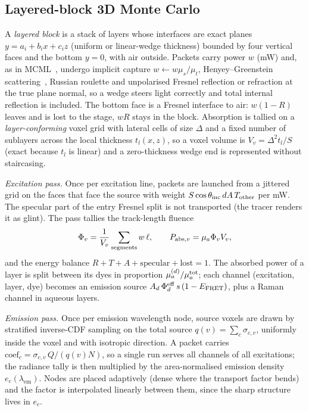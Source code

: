 \documentclass[journal]{IEEEtran}
\newcommand{\mua}{\mu_a}
\newcommand{\mus}{\mu_s}
\newcommand{\mut}{\mu_t}
\newcommand{\lem}{\lambda_{\mathrm{em}}}
\begin{document}
\subsection{Layered-block 3D Monte Carlo}
\label{sec:mc3d}
A \emph{layered block} is a stack of layers whose interfaces are exact planes $y=a_i+b_ix+c_iz$ (uniform or linear-wedge thickness) bounded by four vertical faces and the bottom $y=0$, with air outside. Packets carry power $w$ (mW) and, as in MCML~\cite{wang1995mcml}, undergo implicit capture $w\leftarrow w\mus/\mut$, Henyey--Greenstein scattering~\cite{henyey1941}, Russian roulette and unpolarised Fresnel reflection or refraction at the true plane normal, so a wedge steers light correctly and total internal reflection is included. The bottom face is a Fresnel interface to air: $w(1-R)$ leaves and is lost to the stage, $wR$ stays in the block. Absorption is tallied on a \emph{layer-conforming} voxel grid with lateral cells of size $\Delta$ and a fixed number of sublayers across the local thickness $t_l(x,z)$, so a voxel volume is $V_v=\Delta^2t_l/S$ (exact because $t_l$ is linear) and a zero-thickness wedge end is represented without staircasing.

\emph{Excitation pass.} Once per excitation line, packets are launched from a jittered grid on the faces that face the source with weight $S\cos\theta_{\rm inc}\,dA\,T_{\rm other}$ per mW. The specular part of the entry Fresnel split is not transported (the tracer renders it as glint). The pass tallies the track-length fluence
\begin{equation}
\Phi_v=\frac1{V_v}\sum_{\rm segments} w\,\ell,\qquad P_{{\rm abs},v}=\mua\Phi_vV_v,
\label{eq:fluence}
\end{equation}
and the energy balance $R+T+A+\text{specular}+\text{lost}=1$. The absorbed power of a layer is split between its dyes in proportion $\mua^{(d)}/\mua^{\rm tot}$; each channel (excitation, layer, dye) becomes an emission source $A_d\,\Phi_d^{\rm eff}\,s\,(1-E_{\rm FRET})$, plus a Raman channel in aqueous layers.

\emph{Emission pass.} Once per emission wavelength node, source voxels are drawn by stratified inverse-CDF sampling on the total source $q(v)=\sum_c\sigma_{c,v}$, uniformly inside the voxel and with isotropic direction. A packet carries $\mathrm{coef}_c=\sigma_{c,v}\,Q/(q(v)N)$, so a single run serves all channels of all excitations; the radiance tally is then multiplied by the area-normalised emission density $e_c(\lem)$. Nodes are placed adaptively (dense where the transport factor bends) and the factor is interpolated linearly between them, since the sharp structure lives in $e_c$.
\end{document}
